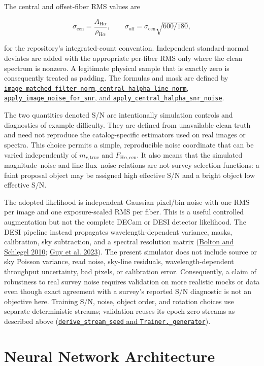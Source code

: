 \documentclass[11pt]{article}
\newcommand{\code}[1]{\nolinkurl{#1}}
\begin{document}
The central and offset-fiber RMS values are

\[
\sigma_\mathrm{cen}
=\frac{A_{\mathrm{H}\alpha}}{\rho_{\mathrm{H}\alpha}},
\qquad
\sigma_\mathrm{off}
=\sigma_\mathrm{cen}\sqrt{600/180},
\]

for the repository's integrated-count convention. Independent standard-normal
deviates are added with the appropriate per-fiber RMS only where the clean
spectrum is nonzero. A legitimate physical sample that is exactly zero is
consequently treated as padding. The formulas and mask are defined by
\href{../arch/data.py}{\code{image_matched_filter_norm}, \code{central_halpha_line_norm}, \code{apply_image_noise_for_snr}, and \code{apply_central_halpha_snr_noise}}.

The two quantities denoted S/N are intentionally simulation controls and
diagnostics of example difficulty. They are defined from unavailable clean
truth and need not reproduce the catalog-specific estimators used on real
images or spectra. This choice permits a simple, reproducible noise coordinate
that can be varied independently of \(m_{r,\mathrm{true}}\) and
\(F_{\mathrm{H}\alpha,\mathrm{cen}}\). It also means that the simulated
magnitude--noise and line-flux--noise relations are not survey selection
functions: a faint proposal object may be assigned high effective S/N and a
bright object low effective S/N.

The adopted likelihood is independent Gaussian pixel/bin noise with one RMS
per image and one exposure-scaled RMS per fiber. This is a useful controlled
augmentation but not the complete DECam or DESI detector likelihood. The DESI
pipeline instead propagates wavelength-dependent variance, masks, calibration,
sky subtraction, and a spectral resolution matrix
(\hyperlink{ref:bolton2010}{Bolton and Schlegel 2010};
\hyperlink{ref:guy2023}{Guy et al. 2023}). The present simulator does not include source or
sky Poisson variance, read noise, sky-line residuals, wavelength-dependent
throughput uncertainty, bad pixels, or calibration error. Consequently, a
claim of robustness to real survey noise requires validation on more realistic
mocks or data even though exact agreement with a survey's reported S/N
diagnostic is not an objective here. Training S/N, noise, object order, and
rotation choices use separate deterministic streams; validation reuses its
epoch-zero streams as described above
(\href{../arch/train.py}{\code{derive_stream_seed} and \code{Trainer._generator}}).

\section{Neural Network Architecture}
\end{document}

